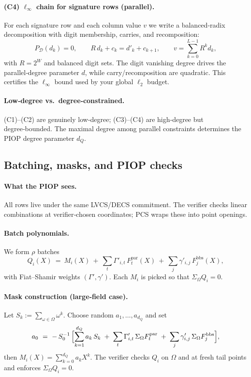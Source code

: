 \paragraph{(C4) $\ell_\infty$ chain for signature rows (parallel).}
For each signature row and each column value $v$ we write a balanced‑radix decomposition with digit membership, carries, and recomposition:
\[
  P_{\mathcal D}(d_{k})=0,\qquad
  R\,d_{k}+c_{k}=d'_{k}+c_{k+1},\qquad
  v=\sum_{k=0}^{L-1}R^k d_k,
\]
with $R=2^W$ and balanced digit sets. The digit vanishing degree drives the parallel‑degree parameter $d$, while carry/recomposition are quadratic. This certifies the $\ell_\infty$ bound used by your global $\ell_2$ budget.

\paragraph{Low‑degree vs.\ degree‑constrained.}
(C1)–(C2) are genuinely low‑degree; (C3)–(C4) are high‑degree but degree‑bounded. The maximal degree among parallel constraints determines the PIOP degree parameter $d_Q$.

\subsection{Batching, masks, and PIOP checks}
\label{subsec:merge-batching}

\paragraph{What the PIOP sees.}
All rows live under the same LVCS/DECS commitment. The verifier checks linear combinations at verifier‑chosen coordinates; PCS wraps these into point openings.

\paragraph{Batch polynomials.}
We form $\rho$ batches
\[
  Q_i(X)\ =\ M_i(X)\ +\ \sum_t \Gamma'_{i,t}\,F^{\mathrm{par}}_{t}(X)\ +\ \sum_j \gamma'_{i,j}\,F^{\mathrm{bbs}}_{j}(X),
\]
with Fiat–Shamir weights $(\Gamma',\gamma')$. Each $M_i$ is picked so that $\Sigma_\Omega Q_i=0$.

\paragraph{Mask construction (large‑field case).}
Let $S_k:=\sum_{\omega\in\Omega}\omega^k$. Choose random $a_1,\dots,a_{d_Q}$ and set
\[
  a_0 \ =\ -\,S_0^{-1}\,\Bigl[
     \sum_{k=1}^{d_Q} a_k\,S_k
     \;+\; \sum_t \Gamma'_{i,t}\,\Sigma_\Omega F^{\mathrm{par}}_{t}
     \;+\; \sum_j \gamma'_{i,j}\,\Sigma_\Omega F^{\mathrm{bbs}}_{j}
  \Bigr],
\]
then $M_i(X)=\sum_{k=0}^{d_Q} a_k X^k$. The verifier checks $Q_i$ on $\Omega$ and at fresh tail points and enforces $\Sigma_\Omega Q_i=0$.

